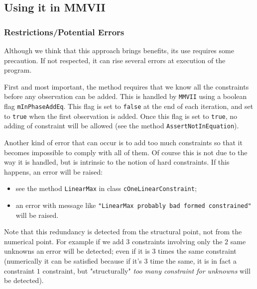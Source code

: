 
\subsection{Using it in MMVII}

\label{Cstr:Use:MMVII}


\subsubsection{Restrictions/Potential Errors}

Although we think that this approach brings benefits, its use requires some precaution.
If not respected, it can rise several errors at execution of the program.

First and most important, the method requires that we know all the constraints
before any observation can be added.  This is handled by {\tt MMVII} using a boolean flag {\tt mInPhaseAddEq}.
This flag is set to {\tt false}  at the end of each iteration, and set to {\tt true} when
the first observation is added.  Once this flag is set to {\tt true}, no adding of constraint
will be allowed (see the method {\tt AssertNotInEquation}).

Another kind of error that can occur is to add too much constraints so that it becomes
impossible to comply with all of them. Of course this is not due to the way it is handled,
but is intrinsic to the notion of hard constraints. If this happens, an error
will be raised:

\begin{itemize}
     \item  see the method {\tt LinearMax} in class  {\tt cOneLinearConstraint};
     \item  an error with  message like {\tt "LinearMax probably bad formed constrained"} will be raised.
\end{itemize}

Note that this redundancy is detected from the structural point, not from the numerical point. For example
if we add $3$ constraints involving only the $2$ same unknowns an error will be detected; even if it is
$3$ times the same constraint (numerically it can be satisfied because if it's $3$ time the same, it is in
fact a constraint $1$ constraint, but "structurally" \emph{too many constraint for unknowns} will be detected).


